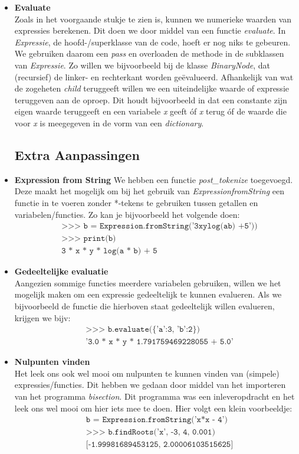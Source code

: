 \documentclass[12pt]{article}
\begin{document}
\begin{itemize}
\item \textbf{Evaluate}\\
Zoals in het voorgaande stukje te zien is, kunnen we numerieke waarden van expressies berekenen. Dit doen we door middel van een functie \textit{evaluate}. In \textit{Expressie}, de hoofd-/superklasse van de code, hoeft er nog niks te gebeuren. We gebruiken daarom een \textit{pass} en overloaden de methode in de subklassen van \textit{Expressie}. Zo willen we bijvoorbeeld bij de klasse \textit{BinaryNode}, dat (recursief) de linker- en rechterkant worden ge\"{e}valueerd. Afhankelijk van wat de zogeheten \textit{child} teruggeeft willen we een uiteindelijke waarde of expressie teruggeven aan de oproep. Dit houdt bijvoorbeeld in dat een constante zijn eigen waarde teruggeeft en een variabele \textit{x} geeft \'{o}f \textit{x} terug \'{o}f de waarde die voor \textit{x} is meegegeven in de vorm van een \textit{dictionary}.


\newpage
\subsection*{Extra Aanpassingen}

\item \textbf{Expression from String}
We hebben een functie \textit{post\_tokenize} toegevoegd. Deze maakt het mogelijk om bij het gebruik van \textit{ExpressionfromString} een functie in te voeren zonder *-tekens te gebruiken tussen getallen en variabelen/functies. Zo kan je bijvoorbeeld het volgende doen:
\begin{align*}
&\texttt{>>> b = Expression.fromString('3xylog(ab) +5'))}\\
&\texttt{>>> print(b)}\\
&\texttt{3 * x * y * log(a * b) + 5}
\end{align*}

\item \textbf{Gedeeltelijke evaluatie}\\
Aangezien sommige functies meerdere variabelen gebruiken, willen we het mogelijk maken om een expressie gedeeltelijk te kunnen evalueren. Als we bijvoorbeeld de functie die hierboven staat gedeeltelijk willen evalueren, krijgen we bijv:
\begin{align*}
&\texttt{>>> b.evaluate(\{'a':3, 'b':2\})}\\
&\texttt{'3.0 * x * y * 1.791759469228055 + 5.0'}
\end{align*}

\item \textbf{Nulpunten vinden}\\
Het leek ons ook wel mooi om nulpunten te kunnen vinden van (simpele) expressies/functies. Dit hebben we gedaan door middel van het importeren van het programma \textit{bisection}. Dit programma was een inleveropdracht en het leek ons wel mooi om hier iets mee te doen. Hier volgt een klein voorbeeldje:
\begin{align*}
&\texttt{b = Expression.fromString('x*x - 4')}\\
&\texttt{>>> b.findRoots('x', -3, 4, 0.001)}\\
&\texttt{[-1.99981689453125, 2.00006103515625]}
\end{align*}


\end{itemize}
\end{document}
